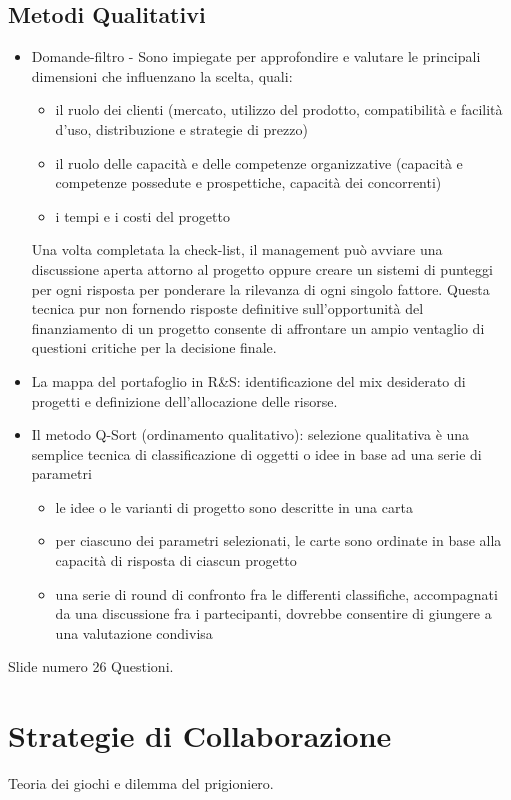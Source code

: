 \documentclass{article}
\begin{document}
\subsection{Metodi Qualitativi}
\begin{itemize}
	\item Domande-filtro - Sono impiegate per approfondire e valutare le principali dimensioni che
	influenzano la scelta, quali:
	\begin{itemize}
		\item il ruolo dei clienti (mercato, utilizzo del prodotto, compatibilità e facilità
		d’uso, distribuzione e strategie di prezzo)
		\item il ruolo delle capacità e delle competenze organizzative (capacità e
		competenze possedute e prospettiche, capacità dei concorrenti)
		\item i tempi e i costi del progetto
	\end{itemize}
Una volta completata la check-list, il management può avviare una
discussione aperta attorno al progetto oppure creare un sistemi di
punteggi per ogni risposta per ponderare la rilevanza di ogni singolo
fattore.
Questa tecnica pur non fornendo risposte definitive sull’opportunità del
finanziamento di un progetto consente di affrontare un ampio ventaglio di
questioni critiche per la decisione finale.

\item La mappa del portafoglio in R\&S: identificazione del mix desiderato di
progetti e definizione dell’allocazione delle risorse.

\item Il metodo Q-Sort (ordinamento qualitativo): selezione qualitativa è una
semplice tecnica di classificazione di oggetti o idee in base ad una serie
di parametri
\begin{itemize}
	\item le idee o le varianti di progetto sono descritte in una carta
	\item per ciascuno dei parametri selezionati, le carte sono ordinate in
	base alla capacità di risposta di ciascun progetto
	\item una serie di round di confronto fra le differenti classifiche,
	accompagnati da una discussione fra i partecipanti, dovrebbe
	consentire di giungere a una valutazione condivisa
\end{itemize}
\end{itemize}

Slide numero 26 Questioni.

\section{Strategie di Collaborazione}
Teoria dei giochi e dilemma del prigioniero.
\end{document}
